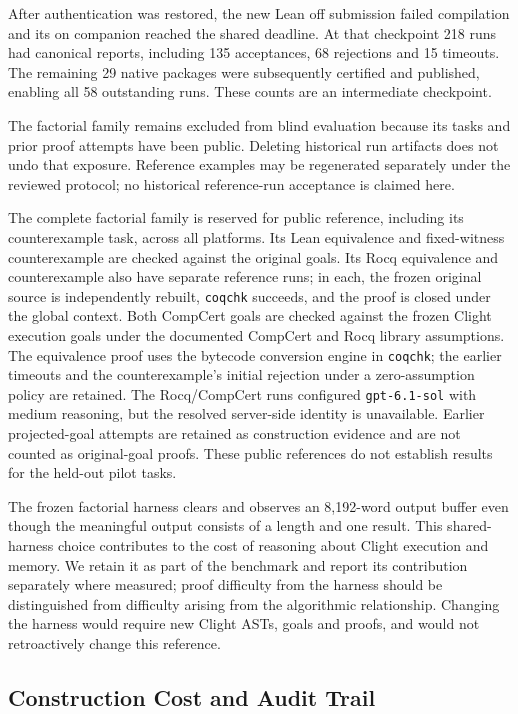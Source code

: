 \documentclass{article}
\begin{document}
After authentication was restored, the new Lean off submission failed compilation and its on companion reached the shared deadline. At that checkpoint 218 runs had canonical reports, including 135 acceptances, 68 rejections and 15 timeouts. The remaining 29 native packages were subsequently certified and published, enabling all 58 outstanding runs. These counts are an intermediate checkpoint.

The factorial family remains excluded from blind evaluation because its tasks and prior proof attempts have been public. Deleting historical run artifacts does not undo that exposure. Reference examples may be regenerated separately under the reviewed protocol; no historical reference-run acceptance is claimed here.

The complete factorial family is reserved for public reference, including its counterexample task, across all platforms. Its Lean equivalence and fixed-witness counterexample are checked against the original goals. Its Rocq equivalence and counterexample also have separate reference runs; in each, the frozen original source is independently rebuilt, \texttt{coqchk} succeeds, and the proof is closed under the global context. Both CompCert goals are checked against the frozen Clight execution goals under the documented CompCert and Rocq library assumptions. The equivalence proof uses the bytecode conversion engine in \texttt{coqchk}; the earlier timeouts and the counterexample's initial rejection under a zero-assumption policy are retained. The Rocq/CompCert runs configured \texttt{gpt-6.1-sol} with medium reasoning, but the resolved server-side identity is unavailable. Earlier projected-goal attempts are retained as construction evidence and are not counted as original-goal proofs. These public references do not establish results for the held-out pilot tasks.

The frozen factorial harness clears and observes an 8,192-word output buffer even though the meaningful output consists of a length and one result. This shared-harness choice contributes to the cost of reasoning about Clight execution and memory. We retain it as part of the benchmark and report its contribution separately where measured; proof difficulty from the harness should be distinguished from difficulty arising from the algorithmic relationship. Changing the harness would require new Clight ASTs, goals and proofs, and would not retroactively change this reference.

\subsection{Construction Cost and Audit Trail}
\end{document}
